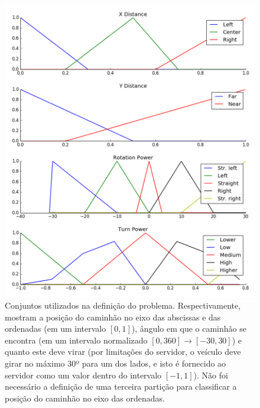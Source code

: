 \documentclass{article}
\begin{document}
\begin{figure}[ht]
    \centering
    \includegraphics[scale=0.45]{figure_1}
    \caption{Conjuntos utilizados na definição do problema. Respectivamente,
        mostram a posição do caminhão no eixo das abscissas e das ordenadas
        (em um intervalo $[0, 1]$), ângulo em que o caminhão se encontra (em
        um intervalo normalizado $[0, 360] \longrightarrow [-30, 30]$) e
        quanto este deve virar (por limitações do servidor, o veículo deve
        girar no máximo 30º para um dos lados, e isto é fornecido ao servidor
        como um valor dentro do intervalo $[-1, 1]$). Não foi necessário a
        definição de uma terceira partição para classificar a posição do
        caminhão no eixo das ordenadas.}
    \label{fig01}
\end{figure}
\end{document}
